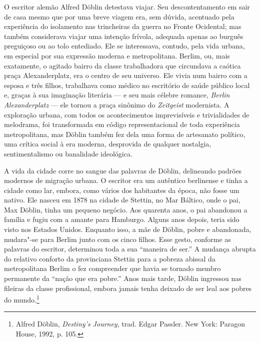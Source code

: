 %

\asterisc

O escritor alemão Alfred Döblin detestava viajar. Seu descontentamento
em sair de casa mesmo que por uma breve viagem era, sem dúvida,
acentuado pela experiência do isolamento nas trincheiras da guerra no
Fronte Ocidental; mas também considerava viajar uma intenção frívola,
adequada apenas ao burguês preguiçoso ou ao tolo entediado. Ele se
interessava, contudo, pela vida urbana, em especial por sua expressão
moderna e metropolitana. Berlim, ou, mais exatamente, o agitado bairro
da classe trabalhadora que circundava a caótica praça Alexanderplatz,
era o centro de seu universo. Ele vivia num bairro com a esposa e três
filhos, trabalhava como médico no escritório de saúde público local e,
graças à sua imaginação literária --- e seu mais célebre romance,
\emph{Berlin Alexanderplatz} --- ele tornou a praça sinônimo do
\emph{Zeitgeist} modernista. A exploração urbana, com todos os
acontecimentos imprevisíveis e trivialidades de melodrama, foi
transformada em código representacional de toda experiência
metropolitana, mas Döblin também fez dela uma forma de artesanato
político, uma crítica social à era moderna, desprovida de qualquer
nostalgia, sentimentalismo ou banalidade ideológica.

A vida da cidade corre no sangue das palavras de Döblin, delineando
padrões modernos de migração urbana. O escritor era um autêntico
berlinense e tinha a cidade como lar, embora, como vários dos habitantes
da época, não fosse um nativo. Ele nasceu em 1878 na cidade de Stettin,
no Mar Báltico, onde o pai, Max Döblin, tinha um pequeno negócio. Aos
quarenta anos, o pai abandonou a família e fugiu com a amante para
Hamburgo. Alguns anos depois, teria sido visto nos Estados Unidos.
Enquanto isso, a mãe de Döblin, pobre e abandonada, mudara"-se para
Berlim junto com os cinco filhos. Esse gesto, conforme as palavras do
escritor, determinou toda a sua ``maneira de ser.'' A mudança abrupta do
relativo conforto da provinciana Stettin para a pobreza abissal da
metropolitana Berlim o fez compreender que havia se tornado membro
permanente da ``nação que era pobre.'' Anos mais tarde, Döblin ingressou
nas fileiras da classe profissional, embora jamais tenha deixado de ser
leal aos pobres do mundo.\footnote{Alfred Döblin, \emph{Destiny's
  Journey}, trad. Edgar Passler. New York: Paragon House, 1992, p. 105.}


